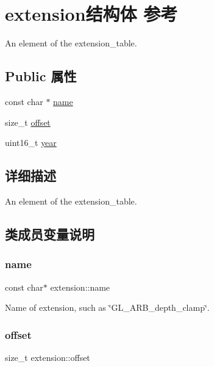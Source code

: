 \hypertarget{structextension}{}\section{extension结构体 参考}
\label{structextension}


An element of the {\ttfamily extension\+\_\+table}.  


\subsection*{Public 属性}
\begin{DoxyCompactItemize}
\item 
const char $\ast$ \hyperlink{structextension_a44e5e2858c6c7d37bdf4a17163b84464}{name}
\item 
size\+\_\+t \hyperlink{structextension_ab916a33c7afe53bd7462e5d623e72556}{offset}
\item 
uint16\+\_\+t \hyperlink{structextension_a6998036f1113bb9eddfe6d447afb7574}{year}
\end{DoxyCompactItemize}


\subsection{详细描述}
An element of the {\ttfamily extension\+\_\+table}. 

\subsection{类成员变量说明}
\mbox{\label{structextension_a44e5e2858c6c7d37bdf4a17163b84464}} 
\subsubsection{\texorpdfstring{name}{name}}
{\footnotesize\ttfamily const char$\ast$ extension\+::name}

Name of extension, such as \char`\"{}\+G\+L\+\_\+\+A\+R\+B\+\_\+depth\+\_\+clamp\char`\"{}. \mbox{\label{structextension_ab916a33c7afe53bd7462e5d623e72556}} 
\subsubsection{\texorpdfstring{offset}{offset}}
{\footnotesize\ttfamily size\+\_\+t extension\+::offset}

